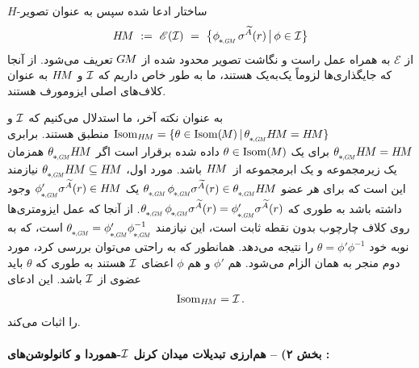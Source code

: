 $H$-ساختار ادعا شده سپس به عنوان تصویر
\begin{align}
	\HM\ :=\ \mathscr{E}(\I)\ =\ \big\{ \dphiGM\, \sigma^{\widetilde{A}}(r) \,\big|\, \phi \in \I \big\}
\end{align}
از $\mathscr{E}$ به همراه عمل راست و نگاشت تصویر محدود شده از $G\mkern-1.4muM$ تعریف می‌شود.
از آنجا که جایگذاری‌ها لزوماً یک‌به‌یک هستند، ما به طور خاص داریم که $\mathcal{I}$ و $H\mkern-2.5muM$ به عنوان کلاف‌های اصلی ایزومورف هستند.


به عنوان نکته آخر، ما استدلال می‌کنیم که $\mathcal{I}$ و $\IsomHM = \{ \theta \in \IsomM \,|\, \dthetaGM \HM = \HM \}$ منطبق هستند.
برابری $\dthetaGM \HM = \HM$ برای یک $\theta \in \operatorname{Isom}(\mkern-1.5mu M \mkern-.5mu)$ داده شده برقرار است اگر $\dthetaGM \HM$ همزمان یک زیرمجموعه و یک ابرمجموعه از~$H\mkern-2.5muM$ باشد.
مورد اول، $\dthetaGM \HM \subseteq \HM$ نیازمند این است که برای هر عضو $\dthetaGM\, \dphiGM \sigma^{\widetilde{A}}(r) \in \dthetaGM \HM$ یک $\dphiGM' \sigma^{\widetilde{A}}(r) \in \HM$ وجود داشته باشد به طوری که $\dthetaGM\, \dphiGM \sigma^{\widetilde{A}}(r) = \dphiGM' \sigma^{\widetilde{A}}(r)$.
از آنجا که عمل ایزومتری‌ها روی کلاف چارچوب بدون نقطه ثابت است، این نیازمند $\dthetaGM = \dphiGM' \dphiGM^{-1}$ است، که به نوبه خود $\theta = \phi' \phi^{-1}$ را نتیجه می‌دهد.
همانطور که به راحتی می‌توان بررسی کرد، مورد دوم منجر به همان الزام می‌شود.
هم $\phi'$ و هم $\phi$ اعضای $\mathcal{I}$ هستند به طوری که $\theta$ باید عضوی از $\mathcal{I}$ باشد.
این ادعای
\begin{align}\label{eq:IsomHM_I}
	\operatorname{Isom}_{H\mkern-2.5muM} = \mathcal{I} \,.
\end{align}
را اثبات می‌کند.














\paragraph{بخش ۲) -- هم‌ارزی تبدیلات میدان کرنل $\mathcal{I}$-هموردا و کانولوشن‌های \textit{}:}

